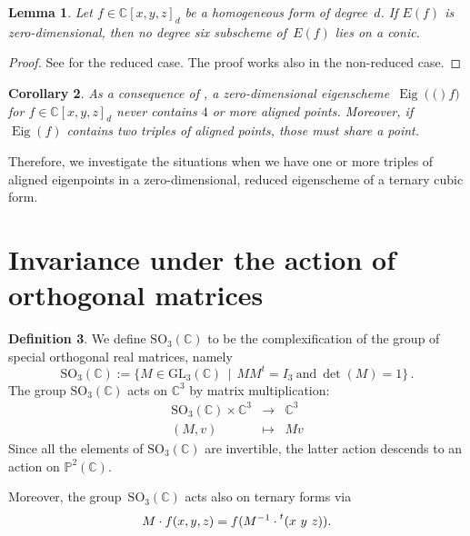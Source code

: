 \documentclass[12pt, a4paper, reqno, captions=tableheading,bibliography=totoc]{scrartcl}
\theoremstyle{plain}
\newtheorem{lemma}{Lemma}[section]
\newtheorem{corollary}[lemma]{Corollary}
\theoremstyle{definition}
\newtheorem{definition}[lemma]{Definition}
\newcommand{\C}{\mathbb{C}}
\newcommand{\p}{\mathbb{P}}
\newcommand{\Eig}[1]{\operatorname{Eig}\left( {#1} \right)}
\begin{document}
\begin{lemma}
\label{lemma:no_six_conic}
Let $f \in \C[x,y,z]_d$ be a homogeneous form of degree~$d$.
If $E(f)$ is zero-dimensional,
then no degree six subscheme of~$E(f)$ lies on a conic.
\end{lemma}
\begin{proof}
See \cite[Lemma~9.1]{OS1} for the reduced case.
The proof works also in the non-reduced case.
\end{proof}

\begin{corollary}
\label{corollary:general_no_triple}
As a consequence of , a zero-dimensional eigenscheme~$\Eig(f)$ for $f \in \C[x,y,z]_d$ never contains $4$ or more aligned points.
Moreover, if $\Eig{f}$ contains two triples of aligned points, those must share a point.
\end{corollary}

Therefore, we investigate the situations when we have one or more triples of aligned eigenpoints in a zero-dimensional, reduced eigenscheme of a ternary cubic form.

\section{Invariance under the action of orthogonal matrices}

\begin{definition}
 We define $\mathrm{SO}_3(\mathbb{C})$ to be the complexification of the group of special orthogonal real matrices, namely
 \[
  \mathrm{SO}_3(\mathbb{C}) :=
  \bigl\{
   M \in \mathrm{GL}_3(\C) \, \mid \,
   M M^t = I_3 \  \text{and} \  \det(M) = 1
  \bigr\} \,.
 \]
 The group $\mathrm{SO}_3(\mathbb{C})$ acts on $\C^3$ by matrix multiplication:
 \[
  \begin{array}{ccc}
   \mathrm{SO}_3(\mathbb{C}) \times \C^3 & \rightarrow & \C^3 \\
   (M, v) & \mapsto & Mv
  \end{array}
 \]
 Since all the elements of $\mathrm{SO}_3(\mathbb{C})$ are invertible, the latter action descends to an action on $\p^2(\C)$.

 Moreover, the group~$\mathrm{SO}_3(\mathbb{C})$ acts also on ternary forms via
 \[
  M \cdot f (x,y,z) = f(M^{-1} \cdot \prescript{t} {}( x \ y \ z )  ).
 \]
\end{definition}
\end{document}
